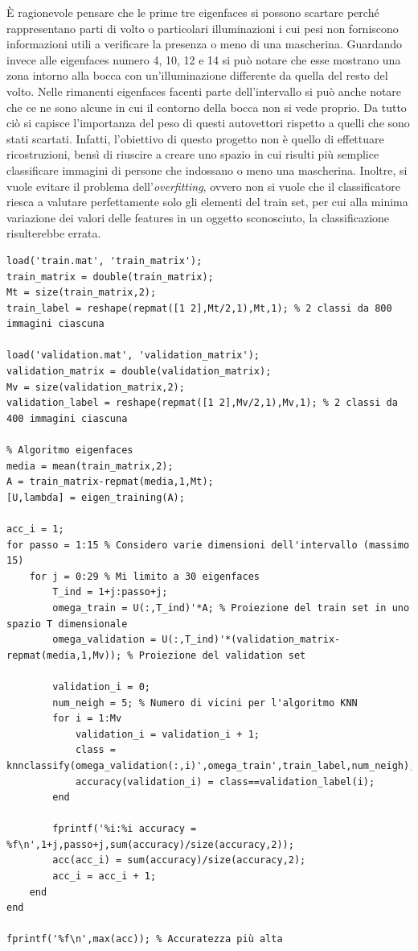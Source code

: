 \documentclass[12pt]{article}
\begin{document}
\`{E} ragionevole pensare che le prime tre eigenfaces si possono scartare perché rappresentano parti di volto o particolari illuminazioni i cui pesi non forniscono informazioni utili a verificare la presenza o meno di una mascherina. Guardando invece alle eigenfaces numero 4, 10, 12 e 14 si può notare che esse mostrano una zona intorno alla bocca con un'illuminazione differente da quella del resto del volto. Nelle rimanenti eigenfaces facenti parte dell'intervallo si può anche notare che ce ne sono alcune in cui il contorno della bocca non si vede proprio. Da tutto ciò si capisce l'importanza del peso di questi autovettori rispetto a quelli che sono stati scartati. Infatti, l'obiettivo di questo progetto non è quello di effettuare ricostruzioni, bensì di riuscire a creare uno spazio in cui risulti più semplice classificare immagini di persone che indossano o meno una mascherina. Inoltre, si vuole evitare il problema dell'\textit{overfitting}, ovvero non si vuole che il classificatore riesca a valutare perfettamente solo gli elementi del train set, per cui alla minima variazione dei valori delle features in un oggetto sconosciuto, la classificazione risulterebbe errata.
\begin{verbatim}
load('train.mat', 'train_matrix');
train_matrix = double(train_matrix);
Mt = size(train_matrix,2);
train_label = reshape(repmat([1 2],Mt/2,1),Mt,1); % 2 classi da 800 immagini ciascuna

load('validation.mat', 'validation_matrix');
validation_matrix = double(validation_matrix);
Mv = size(validation_matrix,2);
validation_label = reshape(repmat([1 2],Mv/2,1),Mv,1); % 2 classi da 400 immagini ciascuna

% Algoritmo eigenfaces
media = mean(train_matrix,2);
A = train_matrix-repmat(media,1,Mt);
[U,lambda] = eigen_training(A);

acc_i = 1;
for passo = 1:15 % Considero varie dimensioni dell'intervallo (massimo 15)
    for j = 0:29 % Mi limito a 30 eigenfaces
        T_ind = 1+j:passo+j;
        omega_train = U(:,T_ind)'*A; % Proiezione del train set in uno spazio T dimensionale
        omega_validation = U(:,T_ind)'*(validation_matrix-repmat(media,1,Mv)); % Proiezione del validation set

        validation_i = 0;
        num_neigh = 5; % Numero di vicini per l'algoritmo KNN
        for i = 1:Mv
            validation_i = validation_i + 1;
            class = knnclassify(omega_validation(:,i)',omega_train',train_label,num_neigh);
            accuracy(validation_i) = class==validation_label(i);
        end

        fprintf('%i:%i accuracy = %f\n',1+j,passo+j,sum(accuracy)/size(accuracy,2));
        acc(acc_i) = sum(accuracy)/size(accuracy,2);
        acc_i = acc_i + 1;
    end
end

fprintf('%f\n',max(acc)); % Accuratezza più alta
\end{verbatim}
\end{document}
